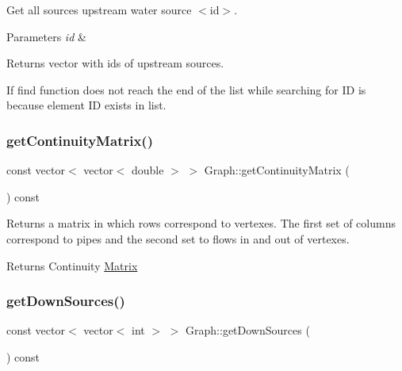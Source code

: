 Get all sources upstream water source $<$id$>$. 
\begin{DoxyParams}{Parameters}
{\em id} & \\
\hline
\end{DoxyParams}
\begin{DoxyReturn}{Returns}
vector with id\textquotesingle{}s of upstream sources. 
\end{DoxyReturn}
If find function does not reach the end of the list while searching for ID is because element ID exists in list. \mbox{\label{classGraph_aa6e27da7010986d54cd2ec79dbbf4abe_aa6e27da7010986d54cd2ec79dbbf4abe}} 
\subsubsection{\texorpdfstring{get\+Continuity\+Matrix()}{getContinuityMatrix()}}
{\footnotesize\ttfamily const vector$<$ vector$<$ double $>$ $>$ Graph\+::get\+Continuity\+Matrix (\begin{DoxyParamCaption}{ }\end{DoxyParamCaption}) const}

Returns a matrix in which rows correspond to vertexes. The first set of columns correspond to pipes and the second set to flows in and out of vertexes. \begin{DoxyReturn}{Returns}
Continuity \mbox{\hyperlink{classMatrix}{Matrix}} 
\end{DoxyReturn}
\mbox{\label{classGraph_a9bbef60829d62f08e802dd1fbda0e4b7_a9bbef60829d62f08e802dd1fbda0e4b7}} 
\subsubsection{\texorpdfstring{get\+Down\+Sources()}{getDownSources()}}
{\footnotesize\ttfamily const vector$<$ vector$<$ int $>$ $>$ Graph\+::get\+Down\+Sources (\begin{DoxyParamCaption}{ }\end{DoxyParamCaption}) const}

\mbox{\label{classGraph_a4d531e9313e31e92b9e816bdb5a9d14f_a4d531e9313e31e92b9e816bdb5a9d14f}} 
